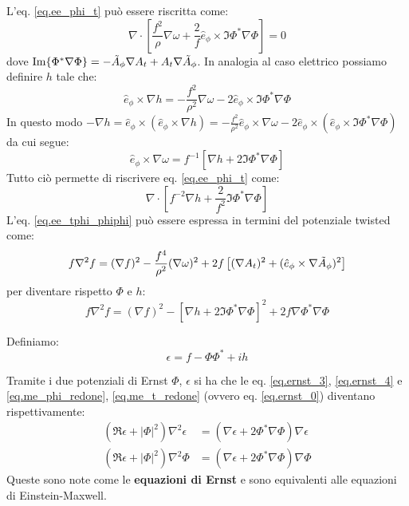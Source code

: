 L'eq. \ref{eq.ee_phi_t} può essere riscritta come:
\begin{equation*}
    \nabla\cdot\left[ \frac{f^2}{\rho}\nabla\omega + \frac{2}{f}\hat{e}_\phi \times \Im{\Phi^*\nabla\Phi}\right] = 0
\end{equation*}
dove $\Im{\Phi^*\nabla\Phi} = - \Tilde{A}_\phi\nabla A_t + A_t\nabla\Tilde{A}_\phi$. In analogia al caso elettrico possiamo definire $h$ tale che:
\begin{equation}
    \hat{e}_\phi \times \nabla h = - \frac{f^2}{\rho^2}\nabla\omega  - 2\hat{e}_\phi\times \Im{\Phi^*\nabla\Phi}
\end{equation}
In questo modo $-\nabla h = \hat{e}_\phi\times(\hat{e}_\phi \times \nabla h) = - \frac{f^2}{\rho^2}\hat{e}_\phi\times\nabla\omega - 2\hat{e}_\phi\times(\hat{e}_\phi \times \Im{\Phi^*\nabla\Phi})$ da cui segue:
\begin{equation*}
    \hat{e}_\phi \times \nabla\omega = f^{-1}\left[ \nabla h +2\Im{\Phi^*\nabla\Phi}\right]
\end{equation*}
Tutto ciò permette di riscrivere eq. \ref{eq.ee_phi_t} come:
\begin{equation}
    \nabla\cdot\left[ f^{-2}\nabla h + \frac{2}{f^2}\Im{\Phi^*\nabla\Phi}\right]
    \label{eq.ernst_3}
\end{equation}
L'eq. \ref{eq.ee_tphi_phiphi} può essere espressa in termini del potenziale twisted come:
\begin{equation*}
    f\nabla^2f = (\nabla f)^2 - \frac{f^4}{\rho^2}(\nabla\omega)^2+2f\left[(\nabla A_t)^2 + (\hat{e}_\phi\times\nabla\Tilde{A}_\phi)^2 \right]
\end{equation*}
per diventare rispetto $\Phi$ e $h$:
\begin{equation}
    f\nabla^2f= (\nabla f)^2 - \left[ \nabla h +2\Im{\Phi^*\nabla\Phi}\right]^2 + 2f\nabla\Phi^*\nabla\Phi
    \label{eq.ernst_4}
\end{equation}
\begin{definizione}
    Definiamo:
    \begin{equation}
        \epsilon = f - \Phi\Phi^* +ih
        \label{eq.potenziale_ernst_epsilon}
    \end{equation}
\end{definizione}
Tramite i due potenziali di Ernst $\Phi$, $\epsilon$ si ha che le eq. \ref{eq.ernst_3}, \ref{eq.ernst_4} e \ref{eq.me_phi_redone}, \ref{eq.me_t_redone} (ovvero eq. \ref{eq.ernst_0}) diventano rispettivamente:
\begin{align}
    (\Re\epsilon + |\Phi|^2)\nabla^2\epsilon &= (\nabla\epsilon + 2\Phi^*\nabla\Phi)\nabla\epsilon \label{eq.ernst_vera_5}\\
    (\Re\epsilon + |\Phi|^2)\nabla^2\Phi &= (\nabla\epsilon + 2\Phi^*\nabla\Phi)\nabla\Phi \label{eq.ernst_vera_6}
\end{align}
Queste sono note come le \textbf{equazioni di Ernst} e sono equivalenti alle equazioni di Einstein-Maxwell.
